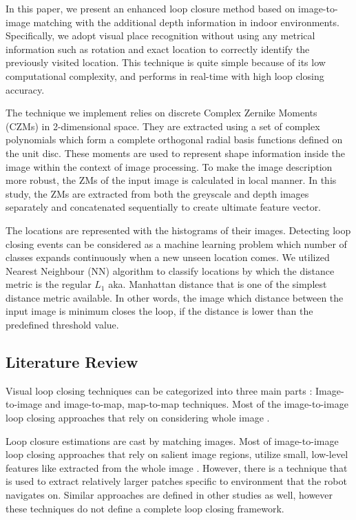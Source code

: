 \documentclass[]{spie}  %
\begin{document}
In this paper, we present an enhanced loop closure method based on image-to-image matching with the additional depth information in indoor environments. Specifically, we adopt visual place recognition without using any metrical information such as rotation and exact location to correctly identify the previously visited location. This technique is quite simple because of its low computational complexity, and performs in real-time with high loop closing accuracy. 

The technique we implement relies on discrete Complex Zernike Moments (CZMs) in 2-dimensional space. They are extracted using a set of complex polynomials which form a complete orthogonal radial basis functions defined on the unit disc. These moments are used to represent shape information inside the image within the context of image processing. To make the image description more robust, the ZMs of the input image is calculated in local manner. In this study, the ZMs are extracted from both the greyscale and depth images separately and concatenated sequentially to create ultimate feature vector.

The locations are represented with the histograms of their images. Detecting loop closing events can be considered as a machine learning problem which number of classes expands continuously when a new unseen location comes. We utilized Nearest Neighbour (NN) algorithm to classify locations by which the distance metric is the regular $L_1$ aka. Manhattan distance that is one of the simplest distance metric available. In other words, the image which distance between the input image is minimum closes the loop, if the distance is lower than the predefined threshold value.

\subsection{Literature Review}

Visual loop closing techniques can be categorized into three main parts\cite{Williams09} : Image-to-image and image-to-map, map-to-map techniques. Most of the image-to-image loop closing approaches that rely on considering whole image\cite{Cadena10, Cummins08} .

Loop closure estimations are cast by matching images. Most of image-to-image loop closing approaches that rely on salient image regions, utilize small, low-level features like \cite{springerlink:10.1007/11744023_32} extracted from the whole image \cite{4633680, CumminsNewmanIJRR08, 5650234, HoNewmanCIRA2005}. However, there is a technique that is used to extract relatively larger patches specific to environment that the robot navigates \cite{sariyanidi_iv} on. Similar approaches are defined in other studies as well\cite{Espinace:2008:UIU:1377036.1377148, 1570189}, however these techniques do not define a complete loop closing framework.
\end{document}
